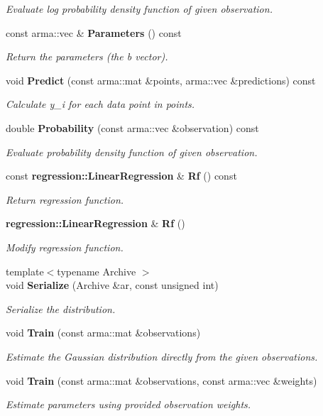 \begin{DoxyCompactItemize}
\begin{DoxyCompactList}\small\item\em Evaluate log probability density function of given observation. \end{DoxyCompactList}\item 
const arma\+::vec \& {\bf Parameters} () const 
\begin{DoxyCompactList}\small\item\em Return the parameters (the b vector). \end{DoxyCompactList}\item 
void {\bf Predict} (const arma\+::mat \&points, arma\+::vec \&predictions) const 
\begin{DoxyCompactList}\small\item\em Calculate y\+\_\+i for each data point in points. \end{DoxyCompactList}\item 
double {\bf Probability} (const arma\+::vec \&observation) const 
\begin{DoxyCompactList}\small\item\em Evaluate probability density function of given observation. \end{DoxyCompactList}\item 
const {\bf regression\+::\+Linear\+Regression} \& {\bf Rf} () const 
\begin{DoxyCompactList}\small\item\em Return regression function. \end{DoxyCompactList}\item 
{\bf regression\+::\+Linear\+Regression} \& {\bf Rf} ()
\begin{DoxyCompactList}\small\item\em Modify regression function. \end{DoxyCompactList}\item 
{\footnotesize template$<$typename Archive $>$ }\\void {\bf Serialize} (Archive \&ar, const unsigned int)
\begin{DoxyCompactList}\small\item\em Serialize the distribution. \end{DoxyCompactList}\item 
void {\bf Train} (const arma\+::mat \&observations)
\begin{DoxyCompactList}\small\item\em Estimate the Gaussian distribution directly from the given observations. \end{DoxyCompactList}\item 
void {\bf Train} (const arma\+::mat \&observations, const arma\+::vec \&weights)
\begin{DoxyCompactList}\small\item\em Estimate parameters using provided observation weights. \end{DoxyCompactList}\end{DoxyCompactItemize}
